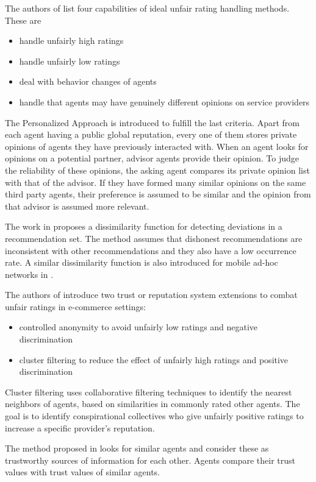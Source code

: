 \documentclass[%
    ]{\PathToTumTemplate/thesis/tum_thesis}
\begin{document}
The authors of \cite{zhang_personalized_2006} list four capabilities of ideal unfair rating handling methods.
These are
\begin{itemize}
\item handle unfairly high ratings
\item handle unfairly low ratings
\item deal with behavior changes of agents
\item handle that agents may have genuinely different opinions on service providers
\end{itemize}
The Personalized Approach is introduced to fulfill the last criteria\cite{zhang_personalized_2006}.
Apart from each agent having a public global reputation, every one of them stores private opinions of agents they have previously interacted with.
When an agent looks for opinions on a potential partner, advisor agents provide their opinion.
To judge the reliability of these opinions, the asking agent compares its private opinion list with that of the advisor.
If they have formed many similar opinions on the same third party agents, their preference is assumed to be similar and the opinion from that advisor is assumed more relevant.

The work in \cite{iltaf_mechanism_2013} proposes a dissimilarity function for detecting deviations in a recommendation set.
The method assumes that dishonest recommendations are inconsistent with other recommendations and they also have a low occurrence rate.
A similar dissimilarity function is also introduced for mobile ad-hoc networks in \cite{zakirullah_detection_2014}.

The authors of \cite{dellarocas_immunizing_2000} introduce two trust or reputation system extensions to combat unfair ratings in e-commerce settings:
\begin{itemize}
\item controlled anonymity to avoid unfairly low ratings and negative discrimination
\item cluster filtering to reduce the effect of unfairly high ratings and positive discrimination
\end{itemize}
Cluster filtering uses collaborative filtering techniques to identify the nearest neighbors of agents, based on similarities in commonly rated other agents.
The goal is to identify conspirational collectives who give unfairly positive ratings to increase a specific provider's reputation.

The method proposed in \cite{zupancic_qade_2015} looks for similar agents and consider these as trustworthy sources of information for each other.
Agents compare their trust values with trust values of similar agents.
\end{document}
